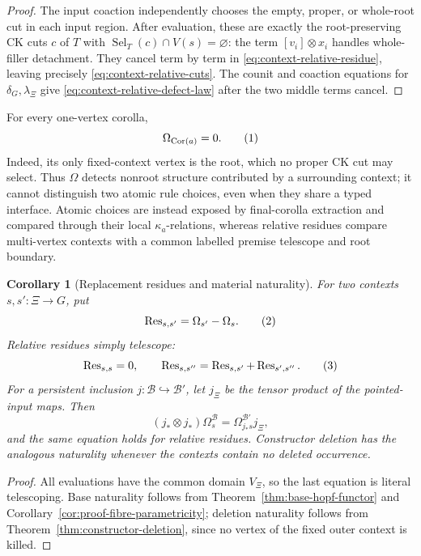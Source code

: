 \documentclass[10pt,a4paper]{article}
\theoremstyle{plain}
\newtheorem{corollary}[theorem]{Corollary}
\theoremstyle{definition}
\theoremstyle{remark}
\newcommand{\Base}{\mathcal B}
\newcommand{\eqtag}{\refstepcounter{equation}\tag{\theequation}}
\begin{document}
\begin{proof}
The input coaction independently chooses the empty, proper, or whole-root
cut in each input region.  After evaluation, these are exactly the
root-preserving CK cuts \(c\) of \(T\) with
\(\operatorname{Sel}_T(c)\cap V(s)=\varnothing\): the term
\([v_i]\otimes x_i\) handles
whole-filler detachment.  They cancel term by term in
\eqref{eq:context-relative-residue}, leaving precisely
\eqref{eq:context-relative-cuts}.  The counit and coaction equations for
\(\delta_G,\lambda_\Xi\) give
\eqref{eq:context-relative-defect-law} after the two middle terms cancel.
\end{proof}

For every one-vertex corolla,
\[
                  \Omega_{\operatorname{Cor}(a)}=0.
\eqtag\label{eq:corolla-residue-zero}
\]
Indeed, its only fixed-context vertex is the root, which no proper CK cut
may select.  Thus \(\Omega\) detects nonroot structure contributed by a
surrounding context; it cannot distinguish two atomic rule choices, even
when they share a typed interface.  Atomic choices are instead exposed by
final-corolla extraction and compared through their local
\(\kappa_a\)-relations, whereas relative residues compare multi-vertex
contexts with a common labelled premise telescope and root boundary.

\begin{corollary}[Replacement residues and material naturality]
\label{cor:replacement-residue}
For two contexts \(s,s':\Xi\to G\), put
\[
 \operatorname{Res}_{s,s'}=\Omega_{s'}-\Omega_s .
\eqtag\label{eq:replacement-residue}
\]
Relative residues simply telescope:
\[
 \operatorname{Res}_{s,s}=0,\qquad
 \operatorname{Res}_{s,s''}
   =\operatorname{Res}_{s,s'}+\operatorname{Res}_{s',s''}.
\eqtag\label{eq:replacement-residue-telescoping}
\]
For a persistent inclusion \(j:\Base\hookrightarrow\Base'\), let
\(j_\Xi\) be the tensor product of the pointed-input maps.  Then
\[
 (j_*\otimes j_*)\Omega_s^{\Base}
   =\Omega_{j_*s}^{\Base'}j_\Xi ,
\]
and the same equation holds for relative residues.  Constructor deletion
has the analogous naturality whenever the contexts contain no deleted
occurrence.
\end{corollary}

\begin{proof}
All evaluations have the common domain \(V_\Xi\), so the last equation
is literal telescoping.
Base naturality follows from Theorem~\ref{thm:base-hopf-functor} and
Corollary~\ref{cor:proof-fibre-parametricity}; deletion naturality follows
from Theorem~\ref{thm:constructor-deletion}, since no vertex of the fixed
outer context is killed.
\end{proof}
\end{document}
